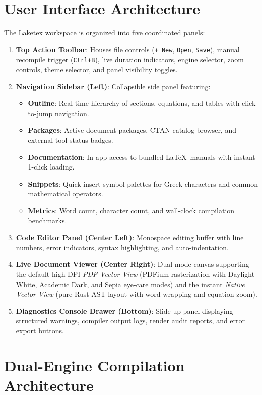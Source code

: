 \documentclass[11pt, a4paper]{article}
\begin{document}
\section{User Interface Architecture}

The Laketex workspace is organized into five coordinated panels:
\begin{enumerate}
    \item \textbf{Top Action Toolbar}: Houses file controls (\texttt{+ New}, \texttt{Open}, \texttt{Save}), manual recompile trigger (\texttt{Ctrl+B}), live duration indicators, engine selector, zoom controls, theme selector, and panel visibility toggles.
    \item \textbf{Navigation Sidebar (Left)}: Collapsible side panel featuring:
    \begin{itemize}
        \item \textbf{Outline}: Real-time hierarchy of sections, equations, and tables with click-to-jump navigation.
        \item \textbf{Packages}: Active document packages, CTAN catalog browser, and external tool status badges.
        \item \textbf{Documentation}: In-app access to bundled \LaTeX\ manuals with instant 1-click loading.
        \item \textbf{Snippets}: Quick-insert symbol palettes for Greek characters and common mathematical operators.
        \item \textbf{Metrics}: Word count, character count, and wall-clock compilation benchmarks.
    \end{itemize}
    \item \textbf{Code Editor Panel (Center Left)}: Monospace editing buffer with line numbers, error indicators, syntax highlighting, and auto-indentation.
    \item \textbf{Live Document Viewer (Center Right)}: Dual-mode canvas supporting the default high-DPI \textit{PDF Vector View} (PDFium rasterization with Daylight White, Academic Dark, and Sepia eye-care modes) and the instant \textit{Native Vector View} (pure-Rust AST layout with word wrapping and equation zoom).
    \item \textbf{Diagnostics Console Drawer (Bottom)}: Slide-up panel displaying structured warnings, compiler output logs, render audit reports, and error export buttons.
\end{enumerate}

\section{Dual-Engine Compilation Architecture}
\end{document}

